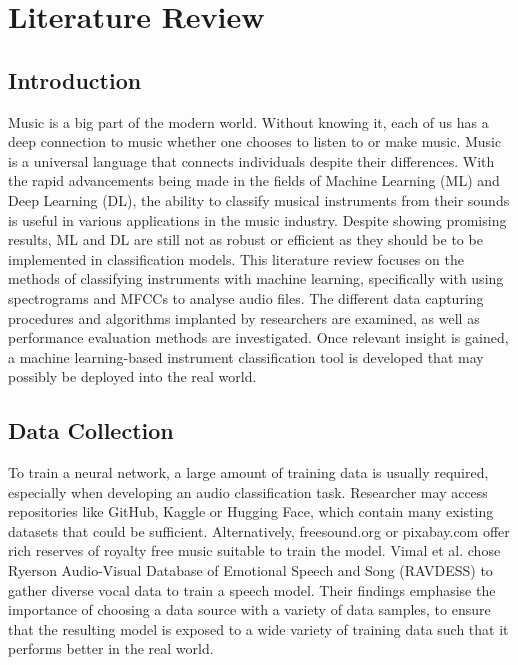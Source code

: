 \documentclass[class=report,11pt,crop=false]{standalone}
\begin{document}
\ifstandalone
\tableofcontents
\fi
\section{Literature Review \label{ch:literature}}
\vspace{0.5cm}

\subsection{Introduction}

Music is a big part of the modern world. Without knowing it, each of us has a deep connection to music whether one chooses to listen to or make music. Music is a universal language that connects individuals despite their differences. With the rapid advancements being made in the fields of Machine Learning (ML) and Deep Learning (DL), the ability to classify musical instruments from their sounds is useful in various applications in the music industry. Despite showing promising results, ML and DL are still not as robust or efficient as they should be to be implemented in classification models. This literature review focuses on the methods of classifying instruments with machine learning, specifically with using spectrograms and MFCCs to analyse audio files. The different data capturing procedures and algorithms implanted by researchers are examined, as well as performance evaluation methods are investigated. Once relevant insight is gained, a machine learning-based instrument classification tool is developed that may possibly be deployed into the real world. 

\subsection{Data Collection}

To train a neural network, a large amount of training data is usually required, especially when developing an audio classification task. Researcher may access repositories like GitHub, Kaggle or Hugging Face, which contain many existing datasets that could be sufficient. Alternatively, freesound.org or pixabay.com offer rich reserves of royalty free music suitable to train the model. 
Vimal et al. \cite{Vimal_2021} chose Ryerson Audio-Visual Database of Emotional Speech and Song (RAVDESS) to gather diverse vocal data to train a speech model. Their findings emphasise the importance of choosing a data source with a variety of data samples, to ensure that the resulting model is exposed to a wide variety of training data such that it performs better in the real world. 
\end{document}
